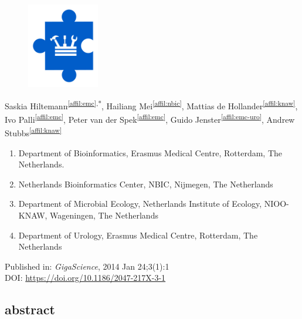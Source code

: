 \cleartorightpage
\setcounter{NAT@ctr}{-1}
\chapter*{}

\begin{figure}[t!]
\centering
\includegraphics[height=10em]{frontmatter/images/chapter-header-tools.png}
\end{figure}
\vspace{-4cm}

\label{chapter:cgtag}
Saskia Hiltemann\textsuperscript{\ref{affil:emc},*},
Hailiang Mei\textsuperscript{\ref{affil:nbic}},
Mattias de Hollander\textsuperscript{\ref{affil:knaw}},
Ivo Palli\textsuperscript{\ref{affil:emc}},
Peter van der Spek\textsuperscript{\ref{affil:emc}},
Guido Jenster\textsuperscript{\ref{affil:emc-uro}},
Andrew Stubbs\textsuperscript{\ref{affil:knaw}}

\small
\begin{enumerate}
\itemsep-0.5em
\item Department of Bioinformatics, Erasmus Medical Centre, Rotterdam, The Netherlands.\label{affil:emc}
\item Netherlands Bioinformatics Center, NBIC, Nijmegen, The Netherlands\label{affil:nbic}
\item Department of Microbial Ecology, Netherlands Institute of Ecology, NIOO-KNAW, Wageningen, The Netherlands\label{affil:knaw}
\item Department of Urology, Erasmus Medical Centre, Rotterdam,  The Netherlands\label{affil:emc-uro}
\end{enumerate}
\normalsize

Published in: \emph{GigaScience}, 2014 Jan 24;3(1):1 \\
DOI: \url{https://doi.org/10.1186/2047-217X-3-1}

\section*{abstract}

